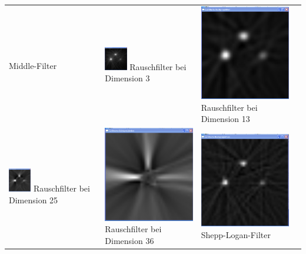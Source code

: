 \begin{center}
\begin{longtable}{p{4.0cm}p{4.0cm}p{4.0cm}l}
    	                  Middle-Filter
    	                  &
    	                  \includegraphics[width=0.25\textwidth, height=0.15\textheight]{pic/Einzelfenster_Bilder/unbekannte_Quelle/unbek5_rausch3.png}
    	                  Rauschfilter bei Dimension 3
    	                  & 
    	                  \includegraphics[width=.25\textwidth, height=0.15\textheight]{pic/Einzelfenster_Bilder/unbekannte_Quelle/unbek5_rausch13.png}               
    	                  Rauschfilter bei Dimension 13\\
    	                  \includegraphics[width=0.25\textwidth, height=0.15\textheight]{pic/Einzelfenster_Bilder/unbekannte_Quelle/unbek5_rausch25.png}
    	                  Rauschfilter bei Dimension 25
    	                  &
    	                  \includegraphics[width=.25\textwidth, height=0.15\textheight]{pic/Einzelfenster_Bilder/unbekannte_Quelle/unbek5_rausch36.png} 
    	                  Rauschfilter bei Dimension 36
    	                  &
    	                  \includegraphics[width=.25\textwidth, height=0.15\textheight]{pic/Einzelfenster_Bilder/unbekannte_Quelle/unbek5_shepp-logan.png}
    	                  Shepp-Logan-Filter
    	                \end{longtable}
    	            \end{center}
